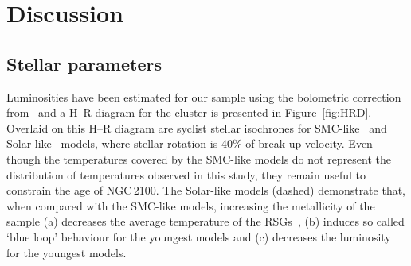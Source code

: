 \documentclass[useAMS,usenatbib]{mn2e}
\begin{document}

\section{Discussion} %
\label{sec:discussion}

\subsection{Stellar parameters} %
\label{sub:stellar_parameters_disc}

Luminosities have been estimated for our sample using the bolometric correction from~\cite{2013ApJ...767....3D} and a H--R diagram for the cluster is presented in Figure~\ref{fig:HRD}.
Overlaid on this H--R diagram are {\sc syclist} stellar isochrones for SMC-like~\citep[solid lines;][]{2013A&A...558A.103G} and Solar-like~\citep[dashed lines;][]{2012A&A...537A.146E} models, where stellar rotation is 40\% of break-up velocity.
Even though the temperatures covered by the SMC-like models do not represent the distribution of temperatures observed in this study, they remain useful to constrain the age of NGC\,2100.
The Solar-like models (dashed) demonstrate that, when compared with the SMC-like models, increasing the metallicity of the sample
(a) decreases the average temperature of the RSGs~\citep[something which is not observed by][]{2015ApJ...803...14P},
(b) induces so called `blue loop' behaviour for the youngest models and
(c) decreases the luminosity for the youngest models.

\end{document}
